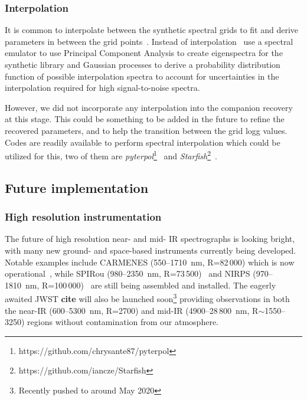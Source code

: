 \documentclass[fleqn,usenatbib]{mnras}
\begin{document}
\subsubsection{Interpolation}
\label{subsubsec:interpolation}
It is common to interpolate between the synthetic spectral grids to fit and derive parameters in between the grid points~\citep[e.g.][]{nemravova_xtauri_2016, passegger_fundamental_2016}. Instead of interpolation~\cite{czekala_constructing_2015} use a spectral emulator to use Principal Component Analysis to create eigenspectra for the synthetic library and Gaussian processes to derive a probability distribution function of possible interpolation spectra to account for uncertainties in the interpolation required for high signal-to-noise spectra.

However, we did not incorporate any interpolation into the companion recovery at this stage. This could be something to be added in the future to refine the recovered parameters, and to help the transition between the grid logg values. Codes are readily available to perform spectral interpolation which could be utilized for this, two of them are \emph{pyterpol}\footnote{https://github.com/chrysante87/pyterpol}~\citet{nemravova_xtauri_2016} and \emph{Starfish}\footnote{https://github.com/iancze/Starfish}~\cite{czekala_constructing_2015}. 


\subsection{Future implementation}
\label{subsec:future}
\subsubsection{High resolution instrumentation}
\label{subsubsec:highres}
The future of high resolution near- and mid- IR spectrographs is looking bright, with many new ground- and space-based instruments currently being developed. Notable examples include CARMENES (550--1710~nm, R=82\,000) which is now operational~\citep{quirrenbach_carmenes_2014}, while SPIRou (980--2350~nm, R=73\,500)~\cite{artigau_spirou_2014} and NIRPS (970--1810~nm, R=100\,000)~\cite{bouchy_nearinfrared_2017} are still being assembled and installed. The eagerly awaited JWST \textbf{cite} will also be launched soon\footnote{Recently pushed to around May 2020} providing observations in both the near-IR (600--5300~nm, R=2700) and mid-IR (4900--28\,800~nm, R$\sim$1550--3250) regions without contamination from our atmosphere.
\end{document}
